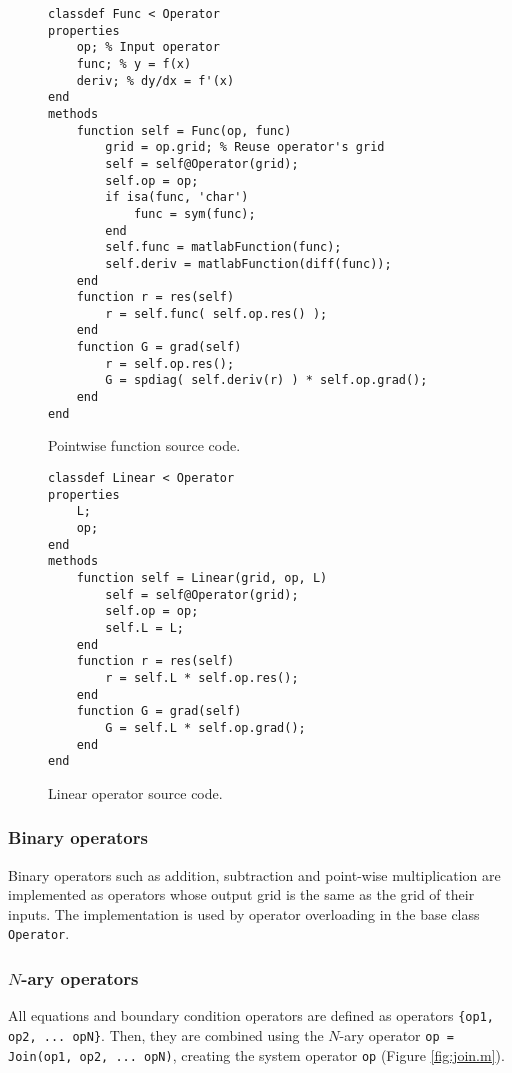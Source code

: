 \documentclass[MSc,beforeExam]{iitcsthesis}
\begin{document}
\begin{figure}[h]
\begin{verbatim}
classdef Func < Operator
properties
    op; % Input operator
    func; % y = f(x)
    deriv; % dy/dx = f'(x)
end
methods
    function self = Func(op, func)
        grid = op.grid; % Reuse operator's grid
        self = self@Operator(grid);
        self.op = op;
        if isa(func, 'char')
        	func = sym(func); 
        end 
        self.func = matlabFunction(func);
        self.deriv = matlabFunction(diff(func));
    end
    function r = res(self)
        r = self.func( self.op.res() );
    end
    function G = grad(self)
        r = self.op.res();
        G = spdiag( self.deriv(r) ) * self.op.grad();
    end
end
\end{verbatim}
\caption{Pointwise function source code.} \label{fig:func.m}
\end{figure}
\begin{figure}[h]
\begin{verbatim}
classdef Linear < Operator
properties
    L;
    op;
end
methods
    function self = Linear(grid, op, L)
        self = self@Operator(grid);
        self.op = op;
        self.L = L;
    end
    function r = res(self)
        r = self.L * self.op.res();
    end
    function G = grad(self)
        G = self.L * self.op.grad();
    end
end
\end{verbatim}
\caption{Linear operator source code.} \label{fig:linear.m}
\end{figure}

\subsubsection{Binary operators}
Binary operators such as addition, subtraction and point-wise 
multiplication are implemented as operators whose
output grid is the same as the grid of their inputs. 
The implementation is used by operator overloading in 
the base class \verb|Operator|.

\subsubsection{$N$-ary operators}
All equations and boundary condition operators are defined
as operators \verb|{op1, op2, ... opN}|. 
Then, they are combined using the $N$-ary operator 
\verb|op = Join(op1, op2, ... opN)|, creating
the system operator \verb|op| (Figure \ref{fig:join.m}).
\end{document}
